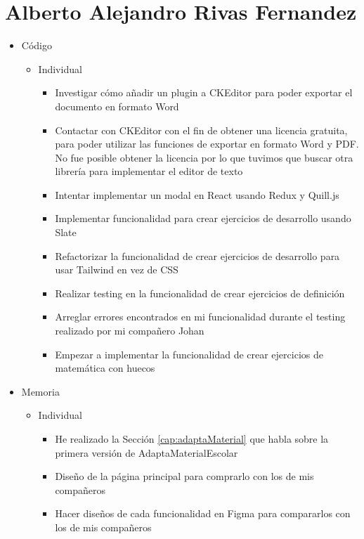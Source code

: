 \section{Alberto Alejandro Rivas Fernandez}
\begin{itemize}
    \item Código
        \begin{itemize}
            \item Individual
                \begin{itemize}
                    \item Investigar cómo añadir un plugin a CKEditor para poder exportar el documento en formato Word
                    \item Contactar con CKEditor con el fin de obtener una licencia gratuita, para poder utilizar las funciones de exportar en formato Word y PDF. No fue posible obtener la licencia por lo que tuvimos que buscar otra librería para implementar el editor de texto
                    \item Intentar implementar un modal en React usando Redux y Quill.js
                    \item Implementar funcionalidad para crear ejercicios de desarrollo usando Slate
                    \item Refactorizar la funcionalidad de crear ejercicios de desarrollo para usar Tailwind en vez de CSS
                    \item Realizar testing en la funcionalidad de crear ejercicios de definición
                    \item Arreglar errores encontrados en mi funcionalidad durante el testing realizado por mi compañero Johan
                    \item Empezar a implementar la funcionalidad de crear ejercicios de matemática con huecos
                \end{itemize}
        \end{itemize}
    \item Memoria
    \begin{itemize}
        \item Individual
            \begin{itemize}
                \item He realizado la Sección \ref{cap:adaptaMaterial} que habla sobre la primera versión de AdaptaMaterialEscolar
                \item Diseño de la página principal para comprarlo con los de mis compañeros
                \item Hacer diseños de cada funcionalidad en Figma para compararlos con los de mis compañeros

\end{itemize}
\end{itemize}
\end{itemize}

